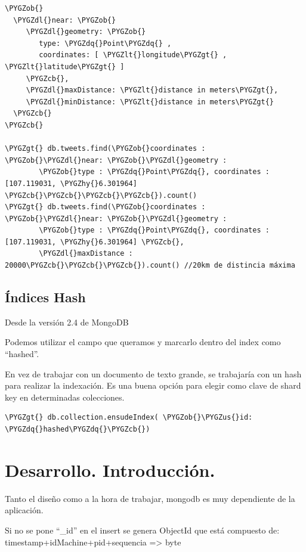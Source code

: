\documentclass[a4paper,10pt,english]{sphinxmanual}
\def\PYGZus{\char`\_}
\def\PYGZob{\char`\{}
\def\PYGZcb{\char`\}}
\def\PYGZlt{\char`\<}
\def\PYGZgt{\char`\>}
\def\PYGZdl{\char`\$}
\def\PYGZhy{\char`\-}
\def\PYGZdq{\char`\"}
\begin{document}
\begin{Verbatim}[commandchars=\\\{\}]
\PYGZob{}
  \PYGZdl{}near: \PYGZob{}
     \PYGZdl{}geometry: \PYGZob{}
        type: \PYGZdq{}Point\PYGZdq{} ,
        coordinates: [ \PYGZlt{}longitude\PYGZgt{} , \PYGZlt{}latitude\PYGZgt{} ]
     \PYGZcb{},
     \PYGZdl{}maxDistance: \PYGZlt{}distance in meters\PYGZgt{},
     \PYGZdl{}minDistance: \PYGZlt{}distance in meters\PYGZgt{}
  \PYGZcb{}
\PYGZcb{}

\PYGZgt{} db.tweets.find(\PYGZob{}coordinates : \PYGZob{}\PYGZdl{}near: \PYGZob{}\PYGZdl{}geometry :
        \PYGZob{}type : \PYGZdq{}Point\PYGZdq{}, coordinates : [107.119031, \PYGZhy{}6.301964] \PYGZcb{}\PYGZcb{}\PYGZcb{}\PYGZcb{}).count()
\PYGZgt{} db.tweets.find(\PYGZob{}coordinates : \PYGZob{}\PYGZdl{}near: \PYGZob{}\PYGZdl{}geometry :
        \PYGZob{}type : \PYGZdq{}Point\PYGZdq{}, coordinates : [107.119031, \PYGZhy{}6.301964] \PYGZcb{},
        \PYGZdl{}maxDistance : 20000\PYGZcb{}\PYGZcb{}\PYGZcb{}).count() //20km de distincia máxima
\end{Verbatim}


\section{Índices Hash}
\label{contents/optimizing:indices-hash}
Desde la versión 2.4 de MongoDB

Podemos utilizar el campo que queramos y marcarlo dentro del index como ``hashed''.

En vez de trabajar con un documento de texto grande, se trabajaría con un hash para realizar la indexación. Es una buena opción para elegir como clave de shard key en determinadas colecciones.

\begin{Verbatim}[commandchars=\\\{\}]
\PYGZgt{} db.collection.ensudeIndex( \PYGZob{}\PYGZus{}id: \PYGZdq{}hashed\PYGZdq{}\PYGZcb{})
\end{Verbatim}


\chapter{Desarrollo. Introducción.}
\label{contents/developmentIntro::doc}\label{contents/developmentIntro:desarrollo-introduccion}
Tanto el diseño como a la hora de trabajar, mongodb es muy dependiente de la aplicación.

Si no se pone ``\_id'' en el insert se genera ObjectId que está compuesto de: timestamp+idMachine+pid+sequencia =\textgreater{} byte
\end{document}
